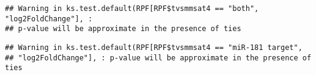 \documentclass[
]{article}
\newenvironment{Shaded}{\begin{snugshade}}{\end{snugshade}}
\newcommand{\FunctionTok}[1]{\textcolor[rgb]{0.13,0.29,0.53}{\textbf{#1}}}
\newcommand{\NormalTok}[1]{#1}
\newcommand{\OtherTok}[1]{\textcolor[rgb]{0.56,0.35,0.01}{#1}}
\newcommand{\SpecialCharTok}[1]{\textcolor[rgb]{0.81,0.36,0.00}{\textbf{#1}}}
\newcommand{\StringTok}[1]{\textcolor[rgb]{0.31,0.60,0.02}{#1}}
\begin{document}
\begin{verbatim}
## Warning in ks.test.default(RPF[RPF$tvsmmsat4 == "both", "log2FoldChange"], :
## p-value will be approximate in the presence of ties
\end{verbatim}

\begin{Shaded}
\end{Shaded}

\begin{verbatim}
## Warning in ks.test.default(RPF[RPF$tvsmmsat4 == "miR-181 target",
## "log2FoldChange"], : p-value will be approximate in the presence of ties
\end{verbatim}
\end{document}
